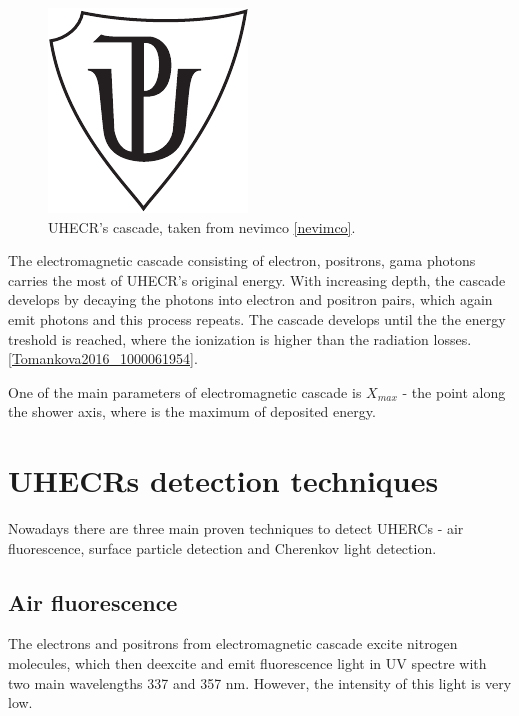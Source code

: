 \begin{figure}[H]
 \centering
 \includegraphics{up_logo_bw}
 \caption{UHECR's cascade, taken from nevimco \ref{nevimco}.}
 \label{cascade}
 
\end{figure}

\par

The electromagnetic cascade consisting of electron, positrons, gama photons carries the most of UHECR's original energy. With increasing depth, the cascade develops by decaying the photons into electron and positron pairs, which again emit photons and this process repeats. The cascade develops until the the energy treshold is reached, where the ionization is higher than the radiation losses. \ref{Tomankova2016_1000061954}.


\par
One of the main parameters of electromagnetic cascade is $X_{max}$ - the point along the shower axis, where is the maximum of deposited energy.

\section{UHECRs detection techniques}
Nowadays there are three main proven techniques to detect UHERCs - 
air fluorescence, surface particle detection and Cherenkov light detection.

\subsection{Air fluorescence}
The electrons and positrons from electromagnetic cascade excite nitrogen molecules, which then deexcite and emit fluorescence light in UV spectre with two main wavelengths 337 and 357 nm. However, the intensity of this light is very low.
\par

\par

